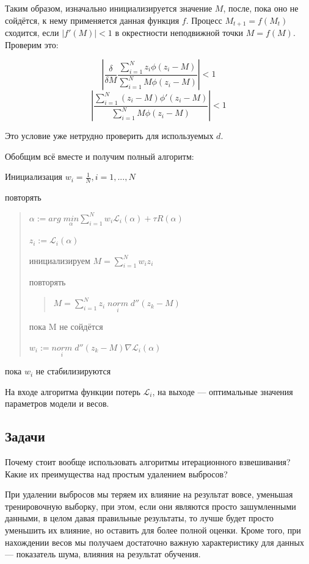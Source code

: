 Таким образом, изначально инициализируется значение $M$, после, пока оно не сойдётся, к нему применяется данная функция $f$. Процесс $M_{t+1} = f(M_t)$ сходится, если $|f'(M)| < 1$ в окрестности неподвижной точки $M = f(M)$. Проверим это:

$$\left|\frac{\delta}{\delta M} \frac{\sum_{i=1}^N z_i \phi(z_i - M)}{\sum_{i=1}^N M \phi(z_i - M)}\right| < 1$$
$$\left|\frac{\sum_{i=1}^N (z_i - M) \phi'(z_i - M)}{\sum_{i=1}^N M \phi(z_i - M)}\right| < 1$$

Это условие уже нетрудно проверить для используемых $d$.

Обобщим всё вместе и получим полный алгоритм:

Инициализация $w_i = \frac{1}{N}, i = 1,...,N$

повторять
\begin{quote}
    $\alpha := arg \; \underset{\alpha}{min} \sum_{i=1}^N w_i \mathscr{L}_i(\alpha) + \tau R(\alpha)$\
    
    $z_i := \mathscr{L}_i(\alpha)$\
    
    инициализируем $M = \sum_{i=1}^N w_i z_i$\

    повторять\
    \begin{quote}
        $M = \sum_{i=1}^N z_i \; \underset{i}{norm} \; d''(z_k - M)$\
    \end{quote}
    
    пока M не сойдётся\
    
    $w_i := \underset{i}{norm} \; d''(z_k - M) \nabla \mathscr{L}_i(\alpha)$ \

\end{quote}

пока $w_i$ не стабилизируются

На входе алгоритма функции потерь $\mathscr{L}_i$, на выходе — оптимальные значения параметров модели и весов.

\subsection{Задачи}

\problem

Почему стоит вообще использовать алгоритмы итерационного взвешивания? Какие их преимущества над простым удалением выбросов? 

\begin{solution}
    При удалении выбросов мы теряем их влияние на результат вовсе, уменьшая тренировочную выборку, при этом, если они являются просто зашумленными данными, в целом давая правильные результаты, то лучше будет просто уменьшить их влияние, но оставить для более полной оценки. Кроме того, при нахождении весов мы получаем достаточно важную характеристику для данных — показатель шума, влияния на результат обучения.
\end{solution}

